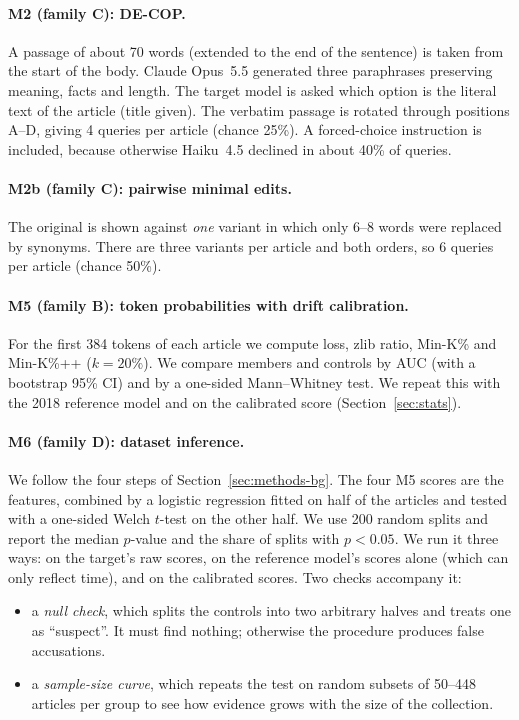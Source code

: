 \documentclass[10pt,a4paper]{article}
\begin{document}
\paragraph{M2 (family C): DE-COP.} A passage of about 70 words (extended to the end of the sentence) is taken from the start of
the body. Claude Opus~5.5 generated three paraphrases preserving meaning, facts and length. The target model is asked
which option is the literal text of the article (title given). The verbatim passage is rotated through positions A--D,
giving 4 queries per article (chance 25\%). A forced-choice instruction is included, because otherwise Haiku~4.5
declined in about 40\% of queries.

\paragraph{M2b (family C): pairwise minimal edits.} The original is shown against \emph{one} variant in which only 6--8 words were
replaced by synonyms. There are three variants per article and both orders, so 6 queries per article (chance 50\%).

\paragraph{M5 (family B): token probabilities with drift calibration.} For the first 384 tokens of each article we
compute loss, zlib ratio, Min-K\% and Min-K\%++ ($k=20\%$). We compare members and controls by AUC (with a bootstrap
95\% CI) and by a one-sided Mann--Whitney test. We repeat this with the 2018 reference model and on the calibrated
score (Section~\ref{sec:stats}).

\paragraph{M6 (family D): dataset inference.} We follow the four steps of Section~\ref{sec:methods-bg}. The four M5
scores are the features, combined by a logistic regression fitted on half of the articles and tested with a one-sided
Welch $t$-test on the other half. We use 200 random splits and report the median $p$-value and the share of splits
with $p<0.05$. We run it three ways: on the target's raw scores, on the reference model's scores alone (which can only
reflect time), and on the calibrated scores. Two checks accompany it:
\begin{itemize}
\item a \emph{null check}, which splits the controls into two arbitrary halves and treats one as ``suspect''. It must
find nothing; otherwise the procedure produces false accusations.
\item a \emph{sample-size curve}, which repeats the test on random subsets of 50--448 articles per group to see how
evidence grows with the size of the collection.
\end{itemize}
\end{document}
